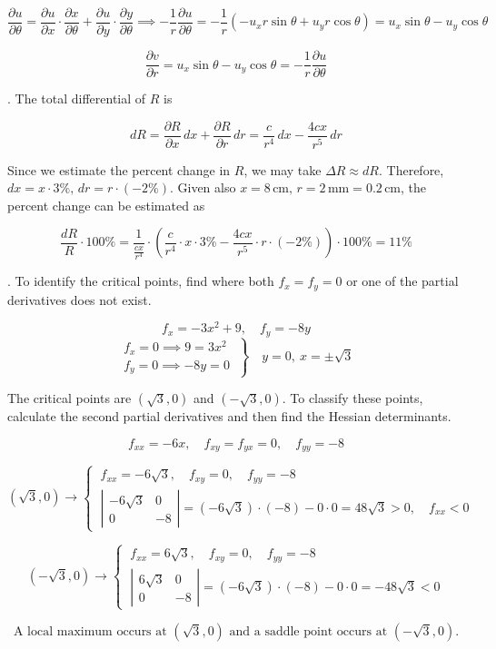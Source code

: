 \documentclass{article}
\begin{document}
\[\frac{\partial u}{\partial\theta}=\frac{\partial u}{\partial x}\cdot\frac{\partial x}{\partial\theta}+\frac{\partial u}{\partial y}\cdot\frac{\partial y}{\partial\theta}\implies-\frac1r\frac{\partial u}{\partial\theta}=-\frac1r\left(-u_x r\sin\theta+u_y r\cos\theta\right)=u_x\sin\theta-u_y\cos\theta\]

\[\frac{\partial v}{\partial r}=u_x\sin\theta-u_y\cos\theta=-\frac1r\frac{\partial u}{\partial \theta}\]

\hfill

. The total differential of $R$ is

\[dR=\frac{\partial R}{\partial x}\,dx+\frac{\partial R}{\partial r}\,dr=\frac c{r^4}\,dx-\frac{4cx}{r^5}\,dr\]

\hfill

\noindent Since we estimate the percent change in $R$, we may take $\Delta R\approx dR$. Therefore, $dx=x\cdot3\%,\,dr=r\cdot(-2\%)$. Given also $x=8\,\text{cm},\,r=2\, \text{mm}=0.2\,\text{cm}$, the percent change can be estimated as

\[\frac{dR}R\cdot100\%=\frac1{\frac{cx}{r^4}}\cdot\left(\frac c{r^4}\cdot x\cdot3\%-\frac{4cx}{r^5}\cdot r\cdot(-2\%)\right)\cdot100\%=\boxed{11\%}\]

\hfill

. To identify the critical points, find where both $f_x=f_y=0$ or one of the partial derivatives does not exist.

\[f_x=-3x^2+9,\quad f_y=-8y\]
\[\left.\begin{array}{c}
f_x=0\implies9=3x^2\\
f_y=0\implies-8y=0 
\end{array}\:\right\}\quad y=0,\:x=\pm\sqrt3\]

\hfill

\noindent The critical points are $\left(\sqrt3,0\right)$ and $\left(-\sqrt3,0\right)$. To classify these points, calculate the second partial derivatives and then find the Hessian determinants.

\[f_{xx}=-6x,\quad f_{xy}=f_{yx}=0,\quad f_{yy}=-8\]

\[\left(\sqrt3,0\right)\rightarrow\left\{\:\begin{array}{l}
f_{xx}=-6\sqrt3,\quad f_{xy}=0,\quad f_{yy}=-8\\[1em]
\left|\begin{array}{cc}
-6\sqrt3 & 0\\
0 & -8
\end{array}\right|=\left(-6\sqrt3\right)\cdot(-8)-0\cdot0=48\sqrt3>0,\quad f_{xx}<0
\end{array}\right.\]

\[\left(-\sqrt3,0\right)\rightarrow\left\{\:\begin{array}{l}
f_{xx}=6\sqrt3,\quad f_{xy}=0,\quad f_{yy}=-8\\[1em]
\left|\begin{array}{cc}
6\sqrt3 & 0\\
0 & -8
\end{array}\right|=\left(-6\sqrt3\right)\cdot(-8)-0\cdot0=-48\sqrt3<0
\end{array}\right.\]

\[\boxed{\text{A local maximum occurs at }\left(\sqrt3,0\right)\text{ and a saddle point occurs at }\left(-\sqrt3,0\right).}\]
\end{document}
